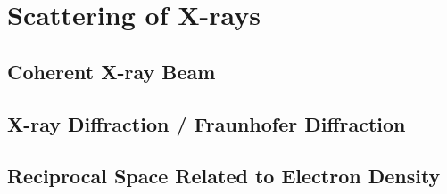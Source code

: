 \chapter{Scattering of X-rays}

\section{Coherent X-ray Beam}

\section{X-ray Diffraction / Fraunhofer Diffraction} %

\section{Reciprocal Space Related to Electron Density}
